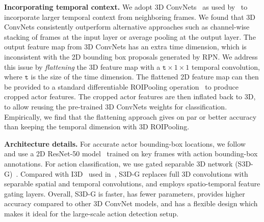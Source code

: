 \documentclass[runningheads]{llncs}
\begin{document}
\medskip\noindent\textbf{Incorporating temporal context.} We adopt 3D ConvNets~\cite{i3d_cvpr17,s3dg_2017} as used by~\cite{ava_cvpr18} to incorporate larger temporal context from neighboring frames. We found that 3D ConvNets consistently outperform alternative approaches such as channel-wise stacking of frames at the input layer or average pooling at the output layer. The output feature map from 3D ConvNets has an extra time dimension, which is inconsistent with the 2D bounding box proposals generated by RPN. We address this issue by \textit{flattening} the 3D feature map with a $\texttt{t}\times 1\times 1$ temporal convolution, where $\texttt{t}$ is the size of the time dimension. The flattened 2D feature map can then be provided to a standard differentiable ROIPooling operation~\cite{STN,huang2016coco} to produce cropped actor features. The cropped actor features are then inflated back to 3D, to allow reusing the pre-trained 3D ConvNets weights for classification. Empirically, we find that the flattening approach gives on par or better accuracy than keeping the temporal dimension with 3D ROIPooling.

\medskip\noindent\textbf{Architecture details.} For accurate actor bounding-box locations, we follow~\cite{ava_cvpr18} and use a 2D ResNet-50 model~\cite{he2016resnet} trained on key frames with action bounding-box annotations. For action classification, we use gated separable 3D network (S3D-G)~\cite{s3dg_2017}. Compared with I3D~\cite{i3d_cvpr17} used in~\cite{ava_cvpr18}, S3D-G replaces full 3D convolutions with separable spatial and temporal convolutions, and employs spatio-temporal feature gating layers. Overall, S3D-G is faster, has fewer parameters, provides higher accuracy compared to other 3D ConvNet models, and has a flexible design which makes it ideal for the large-scale action detection setup.
\end{document}
